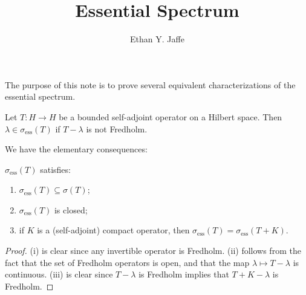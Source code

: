 \documentclass[12pt]{article}
\title{Essential Spectrum}
\author{Ethan Y. Jaffe}
\date{}
\newcommand{\ess}{\sigma_{\text{ess}}}
\begin{document}
\maketitle
\setcounter{section}{1}
The purpose of this note is to prove several equivalent characterizations of the essential spectrum.
\begin{defn}Let $T:H \to H$ be a bounded self-adjoint operator on a Hilbert space. Then $\lambda \in \ess(T)$ if $T-\lambda$ is not Fredholm.\end{defn}
We have the elementary consequences:
\begin{prop}$\ess(T)$ satisfies:
\begin{enumerate}[label = (\roman*)]
\item $\ess(T) \subseteq \sigma(T)$;
\item $\ess(T)$ is closed;
\item if $K$ is a (self-adjoint) compact operator, then $\ess(T) = \ess(T+K)$.
\end{enumerate}
\end{prop}
\begin{proof}(i) is clear since any invertible operator is Fredholm. (ii) follows from the fact that the set of Fredholm operators is open, and that the map $\lambda \mapsto T-\lambda$ is continuous. (iii) is clear since $T-\lambda$ is Fredholm implies that $T+K-\lambda$ is Fredholm. 
\end{proof}
\end{document}
